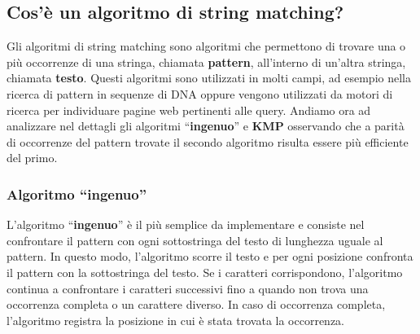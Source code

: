 \documentclass{article}
\begin{document}
\subsection{Cos'è un algoritmo di string matching?}
Gli algoritmi di string matching sono algoritmi che permettono di trovare una o più occorrenze di una stringa, chiamata \textbf{pattern}, all'interno di un'altra stringa, chiamata \textbf{testo}. Questi algoritmi sono utilizzati in molti campi, ad esempio nella ricerca di pattern in sequenze di DNA oppure vengono utilizzati da motori di ricerca per individuare pagine web pertinenti alle query.
Andiamo ora ad analizzare nel dettagli gli algoritmi ``\textbf{ingenuo}'' e \textbf{KMP} osservando che a parità di occorrenze del pattern trovate il secondo algoritmo risulta essere più efficiente del primo.

\subsubsection{Algoritmo ``ingenuo''}
L'algoritmo ``\textbf{ingenuo}'' è il più semplice da implementare e consiste nel confrontare il pattern con ogni sottostringa del testo di lunghezza uguale al pattern. In questo modo, l'algoritmo scorre il testo e per ogni posizione confronta il pattern con la sottostringa del testo. Se i caratteri corrispondono, l'algoritmo continua a confrontare i caratteri successivi fino a quando non trova una occorrenza completa o un carattere diverso. In caso di occorrenza completa, l'algoritmo registra la posizione in cui è stata trovata la occorrenza.
\end{document}
